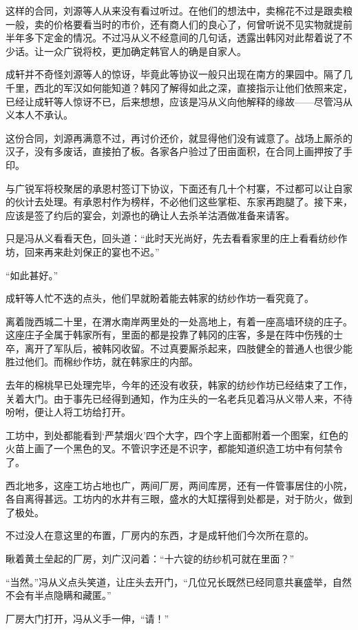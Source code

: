 这样的合同，刘源等人从来没有看过听过。在他们的想法中，卖棉花不过是跟卖粮一般，卖的价格要看当时的市价，还有商人们的良心了，何曾听说不见实物就提前半年多下定金的情况。不过冯从义不经意间的几句话，透露出韩冈对此帮着说了不少话。让一众广锐将校，更加确定韩官人的确是自家人。

成轩并不奇怪刘源等人的惊讶，毕竟此等协议一般只出现在南方的果园中。隔了几千里，西北的军汉如何能知道？韩冈了解得如此之深，直接指示让他们依照来定，已经让成轩等人惊讶不已，后来想想，应该是冯从义向他解释的缘故——尽管冯从义本人不承认。

这份合同，刘源再满意不过，再讨价还价，就显得他们没有诚意了。战场上厮杀的汉子，没有多废话，直接拍了板。各家各户验过了田亩面积，在合同上画押按了手印。

与广锐军将校聚居的承恩村签订下协议，下面还有几十个村寨，不过都可以让自家的伙计去处理。有承恩村作为榜样，不必他们这些掌柜、东家再跑腿了。接下来，应该是签了约后的宴会，刘源也的确让人去杀羊沽酒做准备来请客。

只是冯从义看看天色，回头道：“此时天光尚好，先去看看家里的庄上看看纺纱作坊，回来再来赴刘保正的宴也不迟。”

“如此甚好。”

成轩等人忙不迭的点头，他们早就盼着能去韩家的纺纱作坊一看究竟了。

离着陇西城二十里，在渭水南岸两里处的一处高地上，有着一座高墙环绕的庄子。这座庄子全属于韩家所有，里面的都是投靠了韩冈的庄客，多是在阵中伤残的士卒，离开了军队后，被韩冈收留。不过真要厮杀起来，四肢健全的普通人也很少能胜过他们。而棉纱作坊，就在韩家庄的内部。

去年的棉桃早已处理完毕，今年的还没有收获，韩家的纺纱作坊已经结束了工作，关着大门。由于事先已经得到通知，作为庄头的一名老兵见着冯从义带人来，不待吩咐，便让人将工坊给打开。

工坊中，到处都能看到‘严禁烟火’四个大字，四个字上面都附着一个图案，红色的火苗上画了一个黑色的叉。不管识字还是不识字，都能知道织造工坊中有何禁令了。

西北地多，这座工坊占地也广，两间厂房，两间库房，还有一件管事居住的小院，各自离得甚远。工坊内的水井有三眼，盛水的大缸摆得到处都是，对于防火，做到了极处。

不过没人在意这里的布置，厂房内的东西，才是成轩他们今次所在意的。

瞅着黄土垒起的厂房，刘广汉问着：“十六锭的纺纱机可就在里面？”

“当然。”冯从义点头笑道，让庄头去开门，“几位兄长既然已经同意共襄盛举，自然不会有半点隐瞒和藏匿。”

厂房大门打开，冯从义手一伸，“请！”

